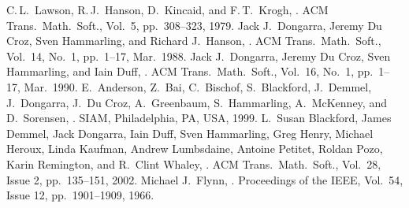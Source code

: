 \begin{thebibliography}{99}
  C.\,L.\ Lawson, R.\,J.\ Hanson, D.\ Kincaid, and F.\,T.\ Krogh,
  .
  ACM Trans.\ Math.\ Soft., Vol.\ 5, pp.\ 308--323, 1979.
  Jack J.\ Dongarra, Jeremy Du Croz, Sven Hammarling, and Richard J.\ Hanson,
  .
  ACM Trans.\ Math.\ Soft., Vol.\ 14, No.\ 1, pp.\ 1--17, Mar.\ 1988.
  Jack J.\ Dongarra, Jeremy Du Croz, Sven Hammarling, and Iain Duff,
  .
  ACM Trans.\ Math.\ Soft., Vol.\ 16, No.\ 1, pp.\ 1--17, Mar.\ 1990.
  E.\ Anderson, Z.\ Bai, C.\ Bischof, S.\ Blackford, J.\ Demmel, J.\ Dongarra,
  J.\ Du Croz, A.\ Greenbaum, S.\ Hammarling, A.\ McKenney, and D.\ Sorensen,
  .
  SIAM, Philadelphia, PA, USA, 1999.
  L.\ Susan Blackford, James Demmel, Jack Dongarra, Iain Duff, Sven Hammarling,
  Greg Henry, Michael Heroux, Linda Kaufman, Andrew Lumbsdaine, Antoine Petitet,
  Roldan Pozo, Karin Remington, and R.\ Clint Whaley,
  .
  ACM Trans.\ Math.\ Soft., Vol.\ 28, Issue 2, pp.\ 135--151, 2002.
  Michael J.\ Flynn,
  .
  Proceedings of the IEEE, Vol.\ 54, Issue 12, pp.\ 1901--1909, 1966.
\end{thebibliography}

\let\realglossitem\glossitem
\renewcommand{\glossitem}[4]{\hangpara{4em}{1}\realglossitem{#1}{#2}{#3}{#4}}

\clearpage
\renewcommand{\glossaryname}{Cross-references}
\renewcommand{\preglossaryhook}{Each clause and subclause label is listed below along with the
corresponding clause or subclause number and page number, in alphabetical order by label.\\}
\twocolglossary
\renewcommand{\leftmark}{\glossaryname}
{
\raggedright
\printglossary[xrefindex]
}

\clearpage

\renewcommand{\glossaryname}{Cross-references from ISO \CppXVII{}}
\renewcommand{\preglossaryhook}{All clause and subclause labels from
ISO \CppXVII{} (ISO/IEC 14882:2017, \doccite{Programming Languages --- \Cpp{}})
are present in this document, with the exceptions described below.\\}
\renewcommand{\leftmark}{\glossaryname}
{
\raggedright
\printglossary[xrefdelta]
}

